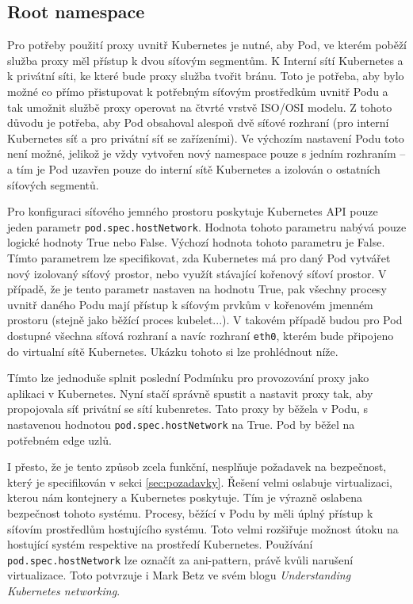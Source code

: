 

\subsection{Root namespace}
Pro potřeby použití proxy uvnitř Kubernetes je nutné, aby Pod, ve kterém poběží služba proxy měl přístup k dvou síťovým segmentům. K Interní sítí Kubernetes a k privátní síti, ke které bude proxy služba tvořit bránu. Toto je potřeba, aby bylo možné co přímo přistupovat k potřebným síťovým prostředkům uvnitř Podu a tak umožnit službě proxy operovat na čtvrté vrstvě ISO/OSI modelu. Z tohoto důvodu je potřeba, aby Pod obsahoval alespoň dvě síťové rozhraní (pro interní Kubernetes síť a pro privátní síť se zařízeními). Ve výchozím nastavení Podu toto není možné, jelikož je vždy vytvořen nový namespace pouze s jedním rozhraním -- a tím je Pod uzavřen pouze do interní sítě Kubernetes a izolován o ostatních síťových segmentů.

Pro konfiguraci síťového jemného prostoru poskytuje Kubernetes API pouze jeden parametr \verb|pod.spec.hostNetwork|. Hodnota tohoto parametru nabývá pouze logické hodnoty True nebo False. Výchozí hodnota tohoto parametru je False. Tímto parametrem lze specifikovat, zda Kubernetes má pro daný Pod vytvářet nový izolovaný síťový prostor, nebo využít stávající kořenový síťoví prostor. V případě, že je tento parametr nastaven na hodnotu True, pak všechny procesy uvnitř daného Podu mají přístup k síťovým prvkům v kořenovém jmenném prostoru (stejně jako běžící proces kubelet...). V takovém případě budou pro Pod dostupné všechna síťová rozhraní a navíc rozhraní \verb|eth0|, kterém bude připojeno do virtualní sítě Kubernetes. Ukázku tohoto si lze prohlédnout níže.



Tímto lze jednoduše splnit poslední Podmínku pro provozování proxy jako aplikaci v Kubernetes. Nyní stačí správně spustit a nastavit proxy tak, aby propojovala síť privátní se sítí kubenretes. Tato proxy by běžela v Podu, s nastavenou hodnotou \verb|pod.spec.hostNetwork| na True. Pod by běžel na potřebném edge uzlů.

I přesto, že je tento způsob zcela funkční, nesplňuje požadavek na bezpečnost, který je specifikován v sekci \ref{sec:pozadavky}. Řešení velmi oslabuje virtualizaci, kterou nám kontejnery a Kubernetes poskytuje. Tím je výrazně oslabena bezpečnost tohoto systému. Procesy, běžící v Podu by měli úplný přístup k síťovím prostředlům hostujícího systému. Toto velmi rozšiřuje možnost útoku na hostující systém respektive na prostředí Kubernetes. Používání \verb|pod.spec.hostNetwork| lze označít za ani-pattern, právě kvůli narušení virtualizace. Toto potvrzuje i Mark Betz ve svém blogu \textit{Understanding Kubernetes networking}. 

